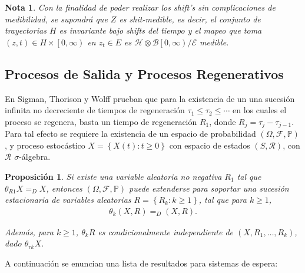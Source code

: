 \documentclass{article}
\newtheorem{Note}{Nota}%
\newtheorem{Prop}{Proposición}%
\newcommand{\prob}{\mathbb{P}}
\numberwithin{equation}{section}
\begin{document}
\begin{Note}
Con la finalidad de poder realizar los shift's sin complicaciones de medibilidad, se supondr\'a que $Z$ es shit-medible, es decir, el conjunto de trayectorias $H$ es invariante bajo shifts del tiempo y el mapeo que toma $\left(z,t\right)\in H\times\left[0,\infty\right)$ en $z_{t}\in E$ es $\mathcal{H}\otimes\mathcal{B}\left[0,\infty\right)/\mathcal{E}$ medible.
\end{Note}


%
\subsection*{Procesos de Salida y Procesos Regenerativos}
%
En Sigman, Thorison y Wolff \cite{Sigman2} prueban que para la existencia de un una sucesi\'on infinita no decreciente de tiempos de regeneraci\'on $\tau_{1}\leq\tau_{2}\leq\cdots$ en los cuales el proceso se regenera, basta un tiempo de regeneraci\'on $R_{1}$, donde $R_{j}=\tau_{j}-\tau_{j-1}$. Para tal efecto se requiere la existencia de un espacio de probabilidad $\left(\Omega,\mathcal{F},\prob\right)$, y proceso estoc\'astico $\textit{X}=\left\{X\left(t\right):t\geq0\right\}$ con espacio de estados $\left(S,\mathcal{R}\right)$, con $\mathcal{R}$ $\sigma$-\'algebra.

\begin{Prop}
Si existe una variable aleatoria no negativa $R_{1}$ tal que $\theta_{R1}X=_{D}X$, entonces $\left(\Omega,\mathcal{F},\prob\right)$ puede extenderse para soportar una sucesi\'on estacionaria de variables aleatorias $R=\left\{R_{k}:k\geq1\right\}$, tal que para $k\geq1$,
\begin{eqnarray*}
\theta_{k}\left(X,R\right)=_{D}\left(X,R\right).
\end{eqnarray*}

Adem\'as, para $k\geq1$, $\theta_{k}R$ es condicionalmente independiente de $\left(X,R_{1},\ldots,R_{k}\right)$, dado $\theta_{\tau k}X$.

\end{Prop}

A continuaci\'on se enuncian una lista de resultados para sistemas de espera:
\end{document}
